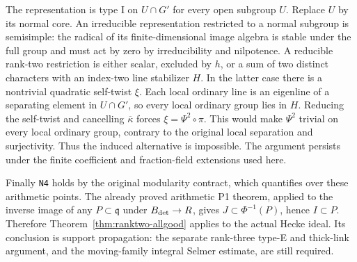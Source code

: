 The representation is type I on $U\cap G'$ for every open subgroup
$U$.  Replace $U$ by its normal core.  An irreducible representation
restricted to a normal subgroup is semisimple: the radical of its
finite-dimensional image algebra is stable under the full group and
must act by zero by irreducibility and nilpotence.  A reducible
rank-two restriction is either scalar, excluded by $h$, or a sum of
two distinct characters with an index-two line stabilizer $H$.
In the latter case there is a nontrivial quadratic self-twist $\xi$.
Each local ordinary line is an eigenline of a separating element
in $U\cap G'$, so every local ordinary group lies in $H$.
Reducing the self-twist and cancelling $\overline\kappa$ forces
$\xi=\Psi^2\circ\pi$.  This would make $\Psi^2$ trivial on
every local ordinary group, contrary to the original local
separation and surjectivity.  Thus the induced alternative is
impossible.  The argument persists under the finite coefficient
and fraction-field extensions used here.

Finally \texttt{N4} holds by the original modularity contract,
which quantifies over these arithmetic points.  The already proved
arithmetic P1 theorem, applied to the inverse image of any
$P\subset\mathfrak q$ under $B_{\rm det}\to R$, gives
$J\subset\Phi^{-1}(P)$, hence $I\subset P$.
Therefore Theorem~\ref{thm:ranktwo-allgood} applies to the actual
Hecke ideal.  Its conclusion is support propagation: the separate
rank-three type-E and thick-link argument, and the moving-family
integral Selmer estimate, are still required.
